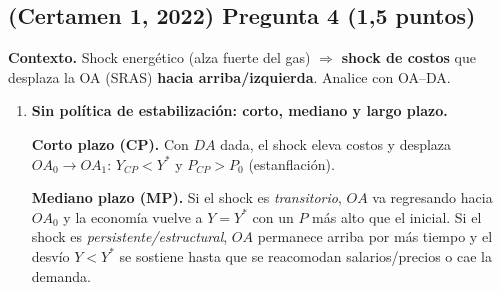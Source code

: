 \documentclass[11pt,addpoints]{article}
\begin{document}
\subsection*{(Certamen 1, 2022) \quad Pregunta 4 (1,5 puntos)}

\textbf{Contexto.} Shock energético (alza fuerte del gas) \(\Rightarrow\) \textbf{shock de costos} que desplaza la OA (SRAS) \textbf{hacia arriba/izquierda}. Analice con OA–DA.

\begin{enumerate}[label=\alph*)]
\item \textbf{Sin política de estabilización: corto, mediano y largo plazo.}

\textbf{Corto plazo (CP).} Con \(DA\) dada, el shock eleva costos y desplaza \(OA_0\to OA_1\):
\(\boxed{Y_{CP}<Y^*}\) y \(\boxed{P_{CP}>P_0}\) (estanflación).

\textbf{Mediano plazo (MP).} Si el shock es \emph{transitorio}, \(OA\) va regresando hacia \(OA_0\) y la economía vuelve a \(\boxed{Y=Y^*}\) con un \(\boxed{P}\) más alto que el inicial.  
Si el shock es \emph{persistente/estructural}, \(OA\) permanece arriba por más tiempo y el desvío \(Y<Y^*\) se sostiene hasta que se reacomodan salarios/precios o cae la demanda.


\end{enumerate}
\end{document}
